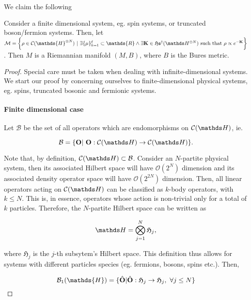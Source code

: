 \documentclass{homework}
\begin{document}
We claim the following

\begin{theo}
    Consider a finite dimensional system, eg. spin systems, or truncated boson/fermion systems. Then, let $\mathcal{M} = \bigg\{ \rho \in \mathcal{C}(\mathds{H}^{\otimes N}) \blanky | \blanky \exists \{\mu\}_{k=1}^{\ell} \subset \mathds{R} \land \exists {\bf K} \in \mathfrak{H}\mathfrak{s}^{\dagger}(\hilbert^{\otimes N}) \textnormal{ such that } \rho \propto e^{-{\bf K}} \bigg\}$. Then $M$ is a Riemannian manifold $(M, B)$, where $B$ is the Bures metric. 
\end{theo}

\begin{proof}

Special care must be taken when dealing with infinite-dimensional systems. We start our proof by concerning ourselves to finite-dimensional physical systems, eg. spins, truncated bosonic and fermionic systems. \\

\paragraph{\textbf{Finite dimensional case}}

Let $\mathcal{B}$ be the set of all operators which are endomorphisms on $\statespace$, ie. 

$$
\mathcal{B} = \{{\bf O} | \blanky {\bf O}: \statespace \rightarrow \statespace\}.
$$

Note that, by definition, $\statespace \subset \mathcal{B}$. Consider an $N$-partite physical system, then its associated Hilbert space will have $\mathcal{O}(2^N)$ dimension and its associated density operator space will have $\mathcal{O}(2^{2N})$ dimension. Then, all linear operators acting on $\statespace$ can be classified as $k$-body operators, with $k \leq N$. This is, in essence, operators whose action is non-trivial only for a total of $k$ particles. Therefore, the $N$-partite Hilbert space can be written as 

$$
    \hilbert = \bigotimes_{j=1}^{N} \mathfrak{H}_j,
$$ 

where $\mathfrak{H}_j$ is the $j$-th subsytem's Hilbert space. This definition thus allows for systems with different particles species (eg. fermions, bosons, spins etc.). Then, 

$$
\mathcal{B}_1(\mathds{H})=\{\hat{\bf O}| \hat{\bf O}:\mathfrak{H}_j \rightarrow \mathfrak{H}_j, \blanky \forall j \leq N \}
$$ 


\end{proof}
\end{document}
